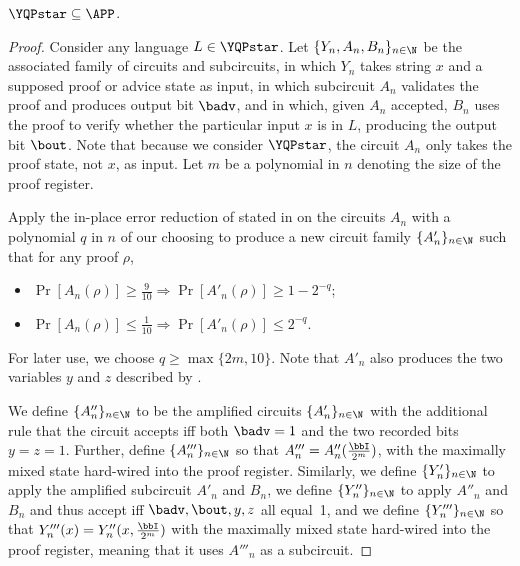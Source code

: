 \documentclass{toc}
\begin{document}
\begin{lemma}\label{lem:YQPinAPP}
	$\YQPstar\subseteq \APP$.
\end{lemma}
\begin{proof}
	Consider any language $L\in \YQPstar$.
	Let $\{Y_n,A_n,B_n\}_{n\in\N}$ be the associated family of circuits
	and subcircuits,
	in which $Y_n$ takes string $x$ and a supposed proof or advice state as input,
	in which subcircuit
	$A_n$ validates the proof and produces output bit $\badv$,
	and in which,
	given $A_n$ accepted, $B_n$ uses the proof to verify whether the particular input
	$x$ is in $L$, producing the output bit $\bout$.
	Note that because we consider $\YQPstar$, the circuit $A_n$ only takes
	the proof state, not $x$, as input.
	Let $m$ be a polynomial in $n$ denoting the size of the
	proof register.
	
	Apply the in-place error reduction of \cite{marriott2005quantum} 
stated in 
	on the circuits $A_n$
	with a polynomial $q$ in $n$ of our choosing
	to produce a new circuit family $\{A'_n\}_{n\in\N}$
	such that for any proof $\rho$,
	\begin{itemize}
		\item $\Pr\left[A_n(\rho)\right] \geq \frac{9}{10} \Rightarrow
		\Pr\left[A'_n(\rho)\right]\geq 1-2^{-q}$;
		\item $\Pr\left[A_n(\rho)\right] \leq \frac{1}{10} \Rightarrow
		\Pr\left[A'_n(\rho)\right]\leq 2^{-q}$.
	\end{itemize}
	For later use, we choose $q \geq \max\{2m,10\}$.
	Note that $A'_n$ also produces the two variables $y$ and $z$ described by .
	
	We define $\{A''_n\}_{n\in\N}$ to be the amplified
	circuits $\{A'_n\}_{n\in\N}$ with the additional rule that the circuit
	accepts iff both $\badv=1$ and the two recorded bits $y=z=1$.
	Further, define $\{A'''_n\}_{n\in\N}$ so that $A'''_n = A''_n(\frac{\bbI}{2^m})$,
	with the maximally mixed state hard-wired into the proof register.
	Similarly, we define $\{Y'_n\}_{n\in\N}$ to apply the amplified subcircuit
	$A'_n$ and $B_n$,
	we define $\{Y''_n\}_{n\in\N}$ to apply $A''_n$ and $B_n$ and thus accept iff
	$\badv,\bout,y,z$ all equal~1,
	and we define $\{Y'''_n\}_{n\in\N}$ so that $Y'''_n(x) = Y''_n(x,\frac{\bbI}{2^m})$
	with the maximally mixed state hard-wired into the proof register,
	meaning that it uses $A'''_n$ as a subcircuit.
	

\end{proof}
\end{document}
